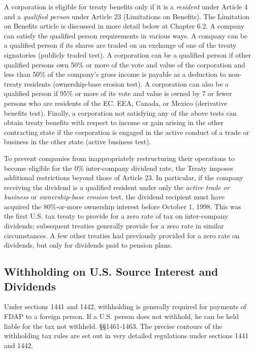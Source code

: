 A corporation is eligible for treaty benefits only if it is a \emph{resident} under Article 4 and a \emph{qualified person} under Article 23 (Limitations on Benefits).  The Limitation on Benefits article is discussed in more detail below at Chapter 6.2.  A company can satisfy the qualified person requirements in various ways.  A company can be a qualified person if its shares are traded on an exchange of one of the treaty signatories (publicly traded test).  A corporation can be a qualified person if other qualified persons own 50\% or more of the vote and value of the corporation and less than 50\% of the company's gross income is payable as a deduction to non-treaty residents (ownership-base erosion test).  A corporation can also be a qualified person if 95\% or more of its vote and value is owned by 7 or fewer persons who are residents of the EC, EEA, Canada, or Mexico (derivative benefits test).  Finally, a corporation not satisfying any of the above tests can obtain treaty benefits with respect to income or gain arising in the other contracting state if the corporation is engaged in the active conduct of a trade or business in the other state (active business test).  

To prevent companies from inappropriately restructuring their operations to become eligible for the 0\% inter-company dividend rate, the Treaty imposes additional restrictions beyond those of Article 23.  In particular, if the company receiving the dividend is a qualified resident under only the \emph{active trade or business} or \emph{ownership-base erosion} test, the dividend recipient must have acquired the 80\%-or-more ownership interest before October 1, 1998.  This was the first U.S. tax treaty to provide for a zero rate of tax on inter-company dividends; subsequent treaties generally provide for a zero rate in similar circumstances.  A few other treaties had previously provided for a zero rate on dividends, but only for dividends paid to pension plans.   

	\subsection{Withholding on U.S. Source Interest and Dividends}

Under sections 1441 and 1442, withholding is generally required for payments of FDAP to a foreign person.  If a U.S. person does not withhold, he can be held liable for the tax not withheld.  \S\S 1461-1463.  The precise contours of the withholding tax rules are set out in very detailed regulations under sections 1441 and 1442.

